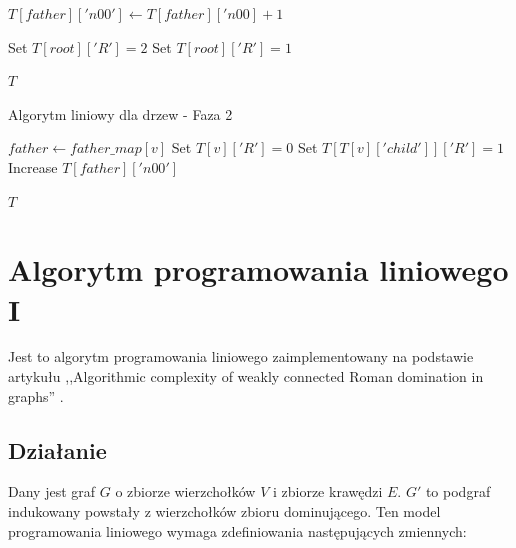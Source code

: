 \begin{algorithm}
\begin{algorithmic}[1]
                        \State $T[father]['n00'] \gets T[father]['n00] + 1$
                    \EndIf

                \EndIf
            \EndFor
    
                \State Set $T[root]['R'] = 2$
            \EndIf
                \State Set $T[root]['R'] = 1$
            \EndIf
    
            \State \Return $T$
        \EndFunction
    \end{algorithmic}
    \end{algorithm}
    
    \begin{algorithm}
    \caption*{Algorytm liniowy dla drzew - Faza 2}
    \begin{algorithmic}[1]
                \State $father \gets father\_map[v]$
                        \State Set $T[v]['R'] = 0$
                        \State Set $T[T[v]['child']]['R'] = 1$
                        \State Increase $T[father]['n00']$
                    \EndIf
                \EndIf
            \EndFor
    
            \State \Return $T$
        \EndFunction
    \end{algorithmic}
\end{algorithm}

\FloatBarrier
\section{Algorytm programowania liniowego I}
Jest to algorytm programowania liniowego zaimplementowany na podstawie artykułu ,,Algorithmic complexity of weakly connected Roman domination in graphs'' \cite{ILP}.

\subsection{Działanie}

Dany jest graf $G$ o zbiorze wierzchołków $V$ i zbiorze krawędzi $E$. $G'$ to podgraf indukowany powstały z wierzchołków zbioru dominującego. Ten model programowania liniowego wymaga zdefiniowania następujących zmiennych:

